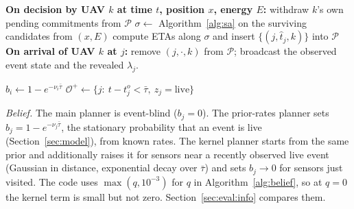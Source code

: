 \documentclass[journal,outdir=./]{IEEEtran}
\begin{document}
\begin{algorithm2e}[t]
\caption{Fleet coordination protocol (depot-mediated)}\label{alg:coord}
\DontPrintSemicolon
{}
\textbf{On decision by UAV $k$ at time $t$, position $x$, energy $E$:}\;
\Indp
 withdraw $k$'s own pending commitments from $\mathcal{P}$\;
 $\sigma\gets$ Algorithm~\ref{alg:sa} on the surviving candidates from $(x,E)$\;
 compute ETAs along $\sigma$ and insert $\{(j,\hat t_j,k)\}$ into $\mathcal{P}$\;
\Indm
\textbf{On arrival of UAV $k$ at $j$:} remove $(j,\cdot,k)$ from $\mathcal{P}$; broadcast the observed event state and the revealed $\lambda_j$.\;
\end{algorithm2e}

\begin{algorithm2e}[t]
\caption{Event-belief update (kernel variant)}\label{alg:belief}
\DontPrintSemicolon
{}
$b_i\gets1-e^{-\nu_i\bar\tau}$ 
$\mathcal{O}^{+}\gets\{j:\ t-t^{o}_j<\bar\tau,\ z_j=\text{live}\}$\;
\end{algorithm2e}

\textit{Belief.} The main planner is event-blind ($b_j=0$). The prior-rates planner sets $b_j=1-e^{-\nu_j\bar\tau}$, the stationary probability that an event is live (Section~\ref{sec:model}), from known rates. The kernel planner starts from the same prior and additionally raises it for sensors near a recently observed live event (Gaussian in distance, exponential decay over $\bar\tau$) and sets $b_j\to0$ for sensors just visited. The code uses $\max(q,10^{-3})$ for $q$ in Algorithm~\ref{alg:belief}, so at $q=0$ the kernel term is small but not zero. Section~\ref{sec:eval:info} compares them.
\end{document}
